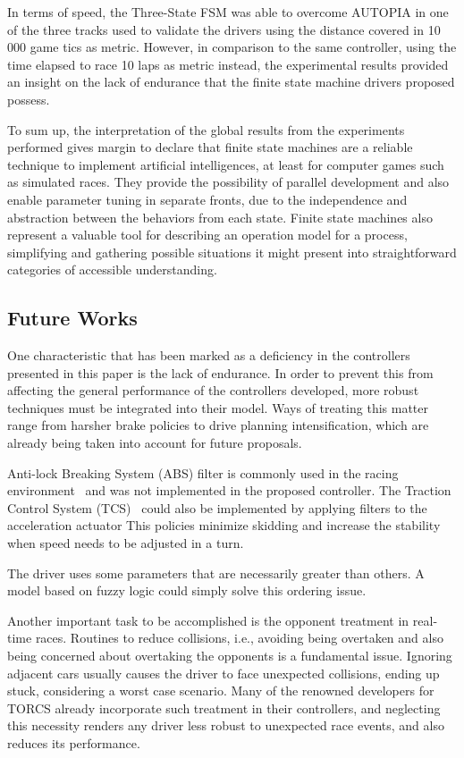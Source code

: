 	In terms of speed, the Three-State FSM was able to overcome AUTOPIA in one of the three tracks used to validate the drivers using the distance covered in 10 000 game tics as metric. However, in comparison to the same controller, using the time elapsed to race 10 laps as metric instead, the experimental results provided an insight on the lack of endurance that the finite state machine drivers proposed possess.
	
	To sum up, the interpretation of the global results from the experiments performed gives margin to declare that finite state machines are a reliable technique to implement artificial intelligences, at least for computer games such as simulated races. They provide the possibility of parallel development and also enable parameter tuning in separate fronts, due to the independence and abstraction between the behaviors from each state. Finite state machines also represent a valuable tool for describing an operation model for a process, simplifying and gathering possible situations it might present into straightforward categories of accessible understanding.

\subsection{Future Works} \label{subsec:Future}
	
	One characteristic that has been marked as a deficiency in the controllers presented in this paper is the lack of endurance. In order to prevent this from affecting the general performance of the controllers developed, more robust techniques must be integrated into their model. Ways of treating this matter range from harsher brake policies to drive planning intensification, which are already being taken into account for future proposals.
	
	Anti-lock Breaking System (ABS) filter is commonly used in the racing environment~\cite{5593318} and was not implemented in the proposed controller. The Traction Control System (TCS)~\cite{5593318} could also be implemented by applying filters to the acceleration actuator This policies minimize skidding and increase the stability when speed needs to be adjusted in a turn.
	
	The driver uses some parameters that are necessarily greater than others. A model based on fuzzy logic \cite{DIEGO} could simply solve this ordering issue.
	
	Another important task to be accomplished is the opponent treatment in real-time races. Routines to reduce collisions, i.e., avoiding being overtaken and also being concerned about overtaking the opponents is a fundamental issue. Ignoring adjacent cars usually causes the driver to face unexpected collisions, ending up stuck, considering a worst case scenario. Many of the renowned developers for TORCS already incorporate such treatment in their controllers, and neglecting this necessity renders any driver less robust to unexpected race events, and also reduces its performance.
	
	